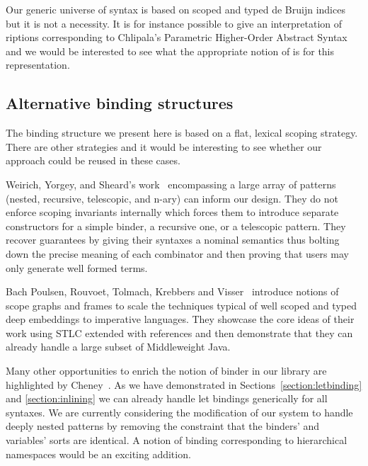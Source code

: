 {Our generic universe of syntax is based on
scoped and typed de Bruijn indices~\cite{de1972lambda} but it is not
a necessity. It is for instance possible to give an interpretation
of riptions corresponding to Chlipala's Parametric Higher-Order
Abstract Syntax~\citeyear{DBLP:conf/icfp/Chlipala08} and we would be interested
to see what the appropriate notion of  is for this representation.

\subsection{Alternative binding structures} The binding structure we
present here is based on a flat, lexical scoping strategy. There are
other strategies and it would be interesting to see whether
our approach could be reused in these cases.

Weirich, Yorgey, and Sheard's work~\citeyear{DBLP:conf/icfp/WeirichYS11}
encompassing a large array of patterns (nested, recursive, telescopic, and
n-ary) can inform our design. They do not enforce scoping invariants internally
which forces them to introduce separate constructors for a simple binder, a
recursive one, or a telescopic pattern. They recover guarantees by giving
their syntaxes a nominal semantics thus bolting down the precise meaning of
each combinator and then proving that users may only generate well formed
terms.

Bach Poulsen, Rouvoet, Tolmach, Krebbers and Visser~\citeyear{BachPoulsen}
introduce notions of scope graphs and frames to scale the techniques typical
of well scoped and typed deep embeddings to imperative languages.
They showcase the core ideas of their work using STLC extended with references
and then demonstrate that they can already handle a large subset of Middleweight
Java.

Many other opportunities to enrich the notion of binder in our library are
highlighted by Cheney~\citeyear{DBLP:conf/icfp/Cheney05a}. As we have demonstrated
in Sections~\ref{section:letbinding} and \ref{section:inlining} we can already
handle let bindings generically for all syntaxes. We are currently considering
the modification of our system to handle deeply nested patterns by removing the
constraint that the binders' and variables' sorts are identical. A notion of
binding corresponding to hierarchical namespaces would be an exciting addition.

}
